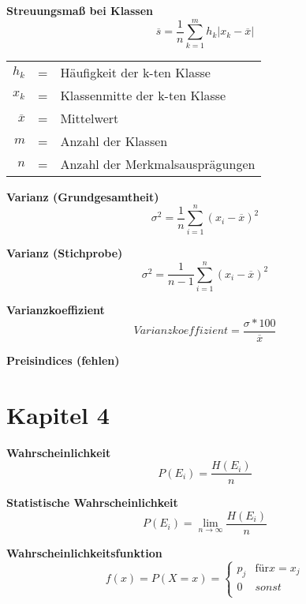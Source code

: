 \documentclass[11pt,twocolumn,fleqn]{article}
\begin{document}
\textbf{Streuungsmaß bei Klassen}
\begin{equation*}
\overline{s}=\frac{1}{n}\sum^m_{k=1}h_k|x_k-\overline{x}|
\end{equation*}
\begin{center}\begin{tabular}{rcl}
   $h_k$ & = & Häufigkeit der k-ten Klasse  \\
   $x_k$ & = & Klassenmitte der k-ten Klasse \\
   $\overline{x}$ & = & Mittelwert \\
   $m$   & = & Anzahl der Klassen \\
   $n$   & = &  Anzahl der Merkmalsausprägungen \\
\end{tabular}\end{center}

\textbf{Varianz (Grundgesamtheit)}
\begin{equation*}
\sigma^2=\frac{1}{n}\sum^n_{i=1}(x_i-\overline{x})^2
\end{equation*}

\textbf{Varianz (Stichprobe)}
\begin{equation*}
\sigma^2=\frac{1}{n-1}\sum^n_{i=1}(x_i-\overline{x})^2
\end{equation*}

\textbf{Varianzkoeffizient}
\begin{equation*}
Varianzkoeffizient = \frac{\sigma * 100}{\overline{x} } 
\end{equation*}

\textbf{Preisindices (fehlen)}

\section{Kapitel 4}

\textbf{Wahrscheinlichkeit}
\begin{equation*}
P(E_i)=\frac{H(E_i)}{n}
\end{equation*}

\textbf{Statistische Wahrscheinlichkeit}
\begin{equation*}
P(E_i)= \lim_{n \to \infty} \frac{H(E_i)}{n}
\end{equation*}

\textbf{Wahrscheinlichkeitsfunktion}
\begin{equation*}
f(x)=P(X=x)= \begin{cases} 
p_j & \text{für}  x = x_j \\ 
0 & sonst  \\ 
\end{cases}
\end{equation*}
\end{document}
